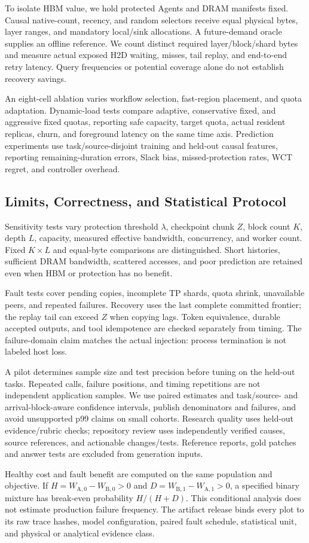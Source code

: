 To isolate HBM value, we hold protected Agents and DRAM manifests fixed.
Causal native-count, recency, and random selectors receive equal physical
bytes, layer ranges, and mandatory local/sink allocations. A future-demand
oracle supplies an offline reference. We count distinct required
layer/block/shard bytes and measure actual exposed H2D waiting, misses,
tail replay, and end-to-end retry latency. Query frequencies or potential
coverage alone do not establish recovery savings.

An eight-cell ablation varies workflow selection, fast-region placement,
and quota adaptation. Dynamic-load tests compare adaptive, conservative
fixed, and aggressive fixed quotas, reporting safe capacity, target quota,
actual resident replicas, churn, and foreground latency on the same time
axis. Prediction experiments use task/source-disjoint training and held-out
causal features, reporting remaining-duration errors, Slack bias,
missed-protection rates, WCT regret, and controller overhead.

\subsection{Limits, Correctness, and Statistical Protocol}\label{sec:eval-limits}

Sensitivity tests vary protection threshold $\lambda$, checkpoint chunk
$Z$, block count $K$, depth $L$, capacity, measured effective bandwidth,
concurrency, and worker count. Fixed $K\times L$ and equal-byte comparisons
are distinguished. Short histories, sufficient DRAM bandwidth, scattered
accesses, and poor prediction are retained even when HBM or protection
has no benefit.

Fault tests cover pending copies, incomplete TP shards, quota shrink,
unavailable peers, and repeated failures. Recovery uses the last complete
committed frontier; the replay tail can exceed $Z$ when copying lags.
Token equivalence, durable accepted outputs, and tool idempotence are
checked separately from timing. The failure-domain claim matches the
actual injection: process termination is not labeled host loss.

A pilot determines sample size and test precision before tuning on the
held-out tasks. Repeated calls, failure positions, and timing repetitions
are not independent application samples. We use paired estimates and
task/source- and arrival-block-aware confidence intervals, publish
denominators and failures, and avoid unsupported p99 claims on small
cohorts. Research quality uses held-out evidence/rubric checks; repository
review uses independently verified causes, source references, and
actionable changes/tests. Reference reports, gold patches and answer tests
are excluded from generation inputs.

Healthy cost and fault benefit are computed on the same population and
objective. If $H=W_{\mathrm{A},0}-W_{\mathrm{B},0}>0$ and
$D=W_{\mathrm{B},1}-W_{\mathrm{A},1}>0$, a specified binary mixture has
break-even probability $H/(H+D)$. This conditional analysis does not
estimate production failure frequency. The artifact release binds every
plot to its raw trace hashes, model configuration, paired fault schedule,
statistical unit, and physical or analytical evidence class.
